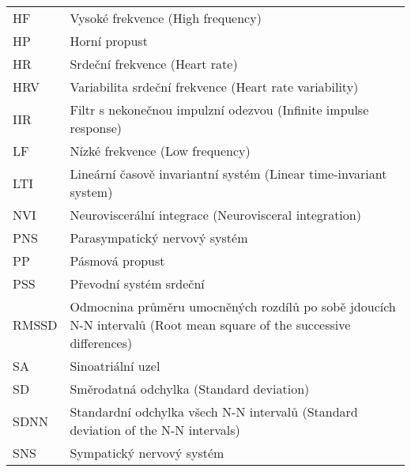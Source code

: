 \begin{table}[h]
\begin{center}
\begin{tabular}{p{2.5cm}p{12.25cm}}
			HF      & Vysoké frekvence (High frequency)                                                                                    \\
			HP      & Horní propust                                                                                                        \\
			HR      & Srdeční frekvence (Heart rate)                                                                                       \\
			HRV     & Variabilita srdeční frekvence (Heart rate variability)                                                               \\
			IIR     & Filtr s nekonečnou impulzní odezvou (Infinite impulse response)                                                      \\
			LF      & Nízké frekvence (Low frequency)                                                                                      \\
			LTI     & Lineární časově invariantní systém (Linear time-invariant system)                                                    \\
			NVI     & Neuroviscerální integrace (Neurovisceral integration)                                                                \\
			PNS     & Parasympatický nervový systém                                                                                        \\
			PP      & Pásmová propust                                                                                                      \\
			PSS     & Převodní systém srdeční                                                                                              \\
			RMSSD   & Odmocnina průměru umocněných rozdílů po sobě jdoucích N-N intervalů (Root mean square of the successive differences) \\
			SA      & Sinoatriální uzel                                                                                                    \\
			SD      & Směrodatná odchylka (Standard deviation)                                                                             \\
			SDNN    & Standardní odchylka všech N-N intervalů (Standard deviation of the N-N intervals)                                    \\
			SNS     & Sympatický nervový systém                                                                                            \\

\end{tabular}
\end{center}
\end{table}
